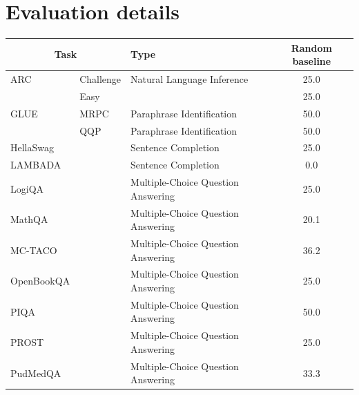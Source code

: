 \documentclass[11pt]{article}
\begin{document}
\newpage

\section{Evaluation details}
\label{sec:sup_eval}
\vfill
\begin{table}[h]
\label{tab:sup_random-baselines}
\begin{center}
\begin{tiny}
\begin{tabular}{lllc}
\toprule
\multicolumn{2}{c}{\textbf{Task}} & \textbf{Type}           &  \textbf{Random baseline}                                \\ 
\midrule
ARC \citep{clark2018arc}      & Challenge & Natural Language Inference & 25.0       \\
             & Easy &     & 25.0                         \\
GLUE         & MRPC  \citep{dolan2016mrpc} & Paraphrase Identification      & 50.0                                                  \\
             & QQP \citep{iyer2019qqp} & Paraphrase Identification      & 50.0                                                             \\  
HellaSwag \citep{zellers2019hellaswag}    & & Sentence Completion           & 25.0                 \\
LAMBADA \citep{paperno2016lambada}      & & Sentence Completion       & 0.0                                        \\
LogiQA \citep{liu2020logiqa}      & & Multiple-Choice Question Answering           & 25.0                                               \\
MathQA \citep{amini2019mathqa}       & & Multiple-Choice Question Answering           & 20.1                                          \\
MC-TACO \citep{zhou2019mctaco} & & Multiple-Choice Question Answering & 36.2 \\
OpenBookQA \citep{mihaylov2press2021train018openbookqa}  & & Multiple-Choice Question Answering          & 25.0       \\
PIQA \citep{bisk2020piqa}         &  & Multiple-Choice Question Answering          & 50.0        \\
PROST  \citep{aroca-ouellette2021prost}        & & Multiple-Choice Question Answering          & 25.0                          \\
PudMedQA \citep{jin2019pubmedqa}     & & Multiple-Choice Question Answering          & 33.3                                         \\

\end{tabular}
\end{tiny}
\end{center}
\end{table}
\end{document}
